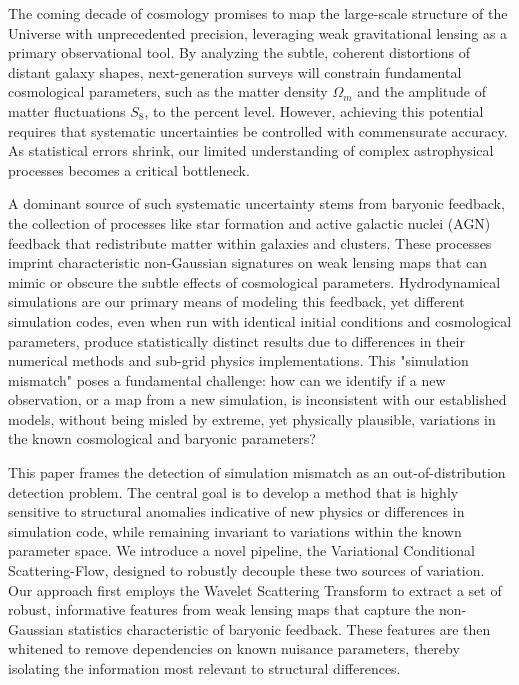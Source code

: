 \documentclass[]{article}
\begin{document}
The coming decade of cosmology promises to map the large-scale structure of the Universe with unprecedented precision, leveraging weak gravitational lensing as a primary observational tool. By analyzing the subtle, coherent distortions of distant galaxy shapes, next-generation surveys will constrain fundamental cosmological parameters, such as the matter density $\Omega_m$ and the amplitude of matter fluctuations $S_8$, to the percent level. However, achieving this potential requires that systematic uncertainties be controlled with commensurate accuracy. As statistical errors shrink, our limited understanding of complex astrophysical processes becomes a critical bottleneck.

A dominant source of such systematic uncertainty stems from baryonic feedback, the collection of processes like star formation and active galactic nuclei (AGN) feedback that redistribute matter within galaxies and clusters. These processes imprint characteristic non-Gaussian signatures on weak lensing maps that can mimic or obscure the subtle effects of cosmological parameters. Hydrodynamical simulations are our primary means of modeling this feedback, yet different simulation codes, even when run with identical initial conditions and cosmological parameters, produce statistically distinct results due to differences in their numerical methods and sub-grid physics implementations. This "simulation mismatch" poses a fundamental challenge: how can we identify if a new observation, or a map from a new simulation, is inconsistent with our established models, without being misled by extreme, yet physically plausible, variations in the known cosmological and baryonic parameters?

This paper frames the detection of simulation mismatch as an out-of-distribution detection problem. The central goal is to develop a method that is highly sensitive to structural anomalies indicative of new physics or differences in simulation code, while remaining invariant to variations within the known parameter space. We introduce a novel pipeline, the Variational Conditional Scattering-Flow, designed to robustly decouple these two sources of variation. Our approach first employs the Wavelet Scattering Transform to extract a set of robust, informative features from weak lensing maps that capture the non-Gaussian statistics characteristic of baryonic feedback. These features are then whitened to remove dependencies on known nuisance parameters, thereby isolating the information most relevant to structural differences.
\end{document}
